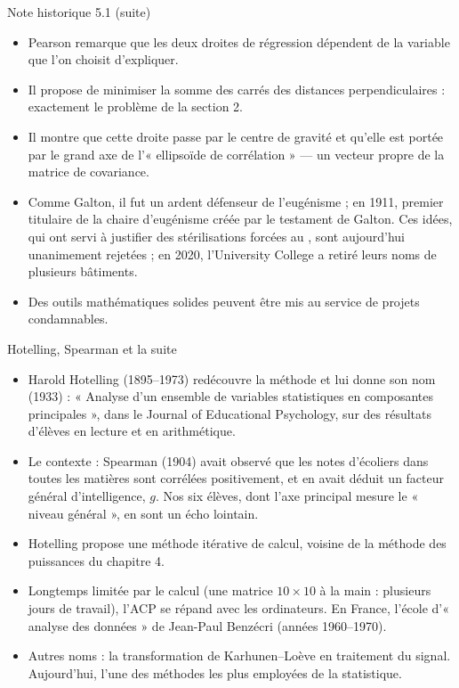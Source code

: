 \begin{frame}{Note historique 5.1 (suite)}
  \small
  \begin{itemize}
    \item Pearson remarque que les deux droites de régression dépendent de
      la variable que l'on choisit d'expliquer.
    \item Il propose de minimiser la somme des carrés des distances
      perpendiculaires : exactement le problème de la section 2.
    \item Il montre que cette droite passe par le centre de gravité et
      qu'elle est portée par le grand axe de l'« ellipsoïde de corrélation »
      --- un vecteur propre de la matrice de covariance.
    \item Comme Galton, il fut un ardent défenseur de l'eugénisme ; en 1911,
      premier titulaire de la chaire d'eugénisme créée par le testament de
      Galton. Ces idées, qui ont servi à justifier des stérilisations
      forcées au , sont aujourd'hui unanimement rejetées ; en
      2020, l'University College a retiré leurs noms de plusieurs
      bâtiments.
    \item Des outils mathématiques solides peuvent être mis au service de
      projets condamnables.
  \end{itemize}
\end{frame}

\begin{frame}{Hotelling, Spearman et la suite}
  \small
  \begin{itemize}
    \item Harold Hotelling (1895--1973) redécouvre la méthode et lui donne
      son nom (1933) : « Analyse d'un ensemble de variables statistiques en
      composantes principales », dans le Journal of Educational Psychology,
      sur des résultats d'élèves en lecture et en arithmétique.
    \item Le contexte : Spearman (1904) avait observé que les notes
      d'écoliers dans toutes les matières sont corrélées positivement, et en
      avait déduit un facteur général d'intelligence, $g$. Nos six élèves,
      dont l'axe principal mesure le « niveau général », en sont un écho
      lointain.
    \item Hotelling propose une méthode itérative de calcul, voisine de la
      méthode des puissances du chapitre 4.
    \item Longtemps limitée par le calcul (une matrice $10\times10$ à la
      main : plusieurs jours de travail), l'ACP se répand avec les
      ordinateurs. En France, l'école d'« analyse des données » de
      Jean-Paul Benzécri (années 1960--1970).
    \item Autres noms : la transformation de Karhunen--Loève en traitement du
      signal. Aujourd'hui, l'une des méthodes les plus employées de la
      statistique.
  \end{itemize}
\end{frame}
